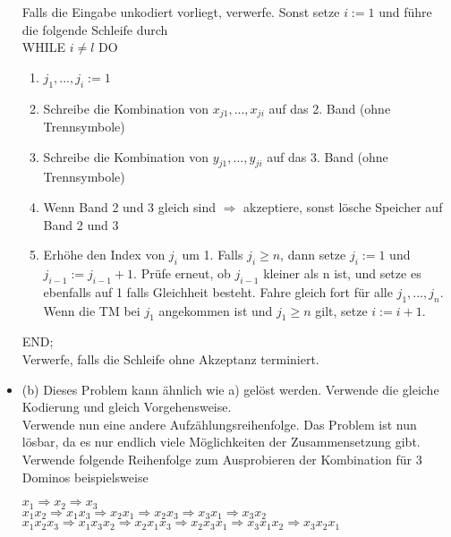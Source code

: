 \documentclass{article}
\begin{document}
\begin{itemize}
	Falls die Eingabe unkodiert vorliegt, verwerfe. Sonst setze $i :=  1$ und führe die folgende Schleife durch\\
	WHILE $i \neq l$ DO\\
	\begin{enumerate}
	\item $j_1,...,j_i := 1$
	\item Schreibe die Kombination von $x_{j1},...,x_{ji}$ auf das 2. Band (ohne Trennsymbole)
	\item Schreibe die Kombination von $y_{j1},...,y_{ji}$ auf das 3. Band (ohne Trennsymbole)
	\item Wenn Band 2 und 3 gleich sind $\Rightarrow$ akzeptiere, sonst lösche Speicher auf Band 2 und 3
	\item Erhöhe den Index von $j_i$ um 1. Falls $j_i \geq  n$, dann setze  $j_i := 1$ und $j_{i-1} := j_{i-1} + 1$. Prüfe erneut, ob $j_{i-1}$ kleiner als n ist, und setze es ebenfalls auf 1 falls Gleichheit besteht. Fahre gleich fort für alle $j_{1},...,j_{n}$. Wenn die TM bei $j_1$ angekommen ist  und $j_1 \geq n$ gilt, setze $i := i+1$.
	\end{enumerate}
	END;\\
	Verwerfe, falls die Schleife ohne Akzeptanz terminiert.
	
	\item (b) Dieses Problem kann ähnlich wie a) gelöst werden. Verwende die gleiche Kodierung und gleich Vorgehensweise.\\
	
	Verwende nun eine andere Aufzählungsreihenfolge. Das Problem ist nun lösbar, da es nur endlich viele Möglichkeiten der Zusammensetzung gibt. Verwende folgende Reihenfolge zum Ausprobieren der Kombination für 3 Dominos beispielsweise
	
	$x_1 \Rightarrow x_2 \Rightarrow x_3$\\
	
	$x_1 x_2 \Rightarrow x_1 x_3 \Rightarrow x_2 x_1 \Rightarrow x_2 x_3 \Rightarrow x_3 x_1 \Rightarrow x_3 x_2$\\
	
$x_1 x_2 x_3 \Rightarrow x_1 x_3 x_2 \Rightarrow x_2 x_1 x_3 \Rightarrow x_2 x_3 x_1 \Rightarrow x_3 x_1 x_2 \Rightarrow x_3 x_2 x_1$\\


\end{itemize}
\end{document}

